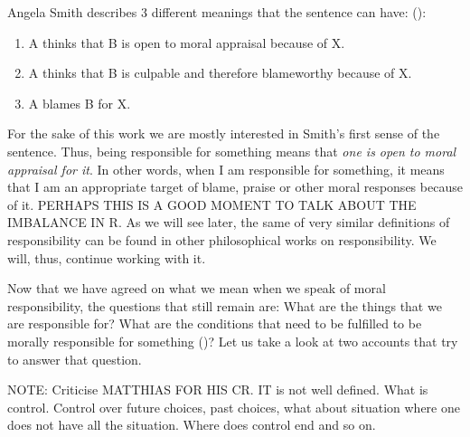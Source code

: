 \documentclass{article}
\begin{document}
Angela Smith describes 3 different meanings that the sentence
 can have:
(\cite[p. 469]{Smith_2007}):

\begin{enumerate}
	\item A thinks that B is open to moral appraisal because of X.\\
	\item A thinks that B is culpable and therefore blameworthy because of
		X.\\
	\item A blames B for X.
\end{enumerate}

For the sake of this work we are mostly interested in Smith's first sense of the
sentence. Thus, being responsible for something means that \textit{one is open to moral
appraisal for it}. In other words, when I am responsible for something, it means
that I am an appropriate target of blame, praise or other moral responses
because of it. PERHAPS THIS IS A GOOD MOMENT TO TALK ABOUT THE IMBALANCE IN R.
As we will see later, the same of very similar definitions of
responsibility can be found in other philosophical works on responsibility. We
will, thus, continue working with it.


Now that we have agreed on what we mean when we speak of moral responsibility,
the questions that still remain are: What are the things that we are responsible
for? What are the conditions that need to be fulfilled to be morally responsible
for something (\cite[p. 370]{smith2008control})? Let us take a look at two
accounts that try to answer that question.


NOTE: Criticise MATTHIAS FOR HIS CR. IT is not well defined. What is control. Control
over future choices, past choices, what about situation where one does not have
all the situation. Where does control end and so on.



%
%
%
\end{document}

